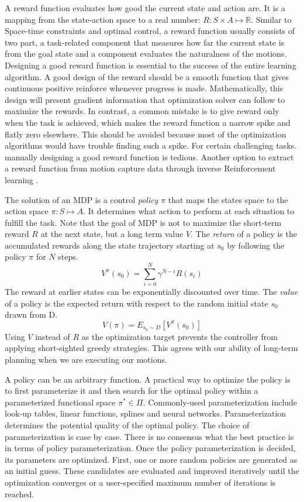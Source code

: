 A reward function evaluates how good the current state and action are. It is a mapping from the state-action space to a real number: $R: S\times A\mapsto \mathbb{R}$. Similar to Space-time constraints and optimal control, a reward function usually consists of two part, a task-related component that measures how far the current state is from the goal state and a component evaluates the naturalness of the motions. Designing a good reward function is essential to the success of the entire learning algorithm. A good design of the reward should be a smooth function that gives continuous positive reinforce whenever progress is made. Mathematically, this design will present gradient information that optimization solver can follow to maximize the rewards. In contrast, a common mistake is to give reward only when the task is achieved, which makes the reward function a narrow spike and flatly zero elsewhere. This should be avoided because most of the optimization algorithms would have trouble finding such a spike. For certain challenging tasks. manually designing a good reward function is tedious. Another option to extract a reward function from motion capture data through inverse Reinforcement learning \cite{}.

The solution of an MDP is a control \emph{policy} $\pi$ that maps the states space to the action space $\pi: S\mapsto A$. It determines what action to perform at each situation to fulfill the task. Note that the goal of MDP is not to maximize the short-term reward $R$ at the next state, but a long term value $V$. The \emph{return} of a policy is the accumulated rewards along the state trajectory starting at $s_0$ by following the policy $\pi$ for $N$ steps.
\begin{displaymath}
V^\pi(s_0)=\sum_{i=0}^N{\gamma^{N-i}R(s_i)}
\end{displaymath}
The reward at earlier states can be exponentially discounted over time. The \emph{value} of a policy is the expected return with respect to the random initial state $s_0$ drawn from D.
\begin{equation}
V(\pi)=E_{s_0\sim D}[V^\pi(s_0)]
\label{eq:policyValue}
\end{equation}
Using $V$ instead of $R$ as the optimization target prevents the controller from applying short-sighted greedy strategies. This agrees with our ability of long-term planning when we are executing our motions.

A policy can be an arbitrary function. A practical way to optimize the policy is to first parameterize it and then search for the optimal policy within a parameterized functional space $\pi^*\in\Pi$. Commonly-used parameterization include look-up tables, linear functions, splines and neural networks. Parameterization determines the potential quality of the optimal policy. The choice of parameterization is case by case. There is no consensus what the best practice is in terms of policy parameterization. Once the policy parameterization is decided, its parameters are optimized. First, one or more random policies are generated as an initial guess. These candidates are evaluated and improved iteratively until the optimization converges or a user-specified maximum number of iterations is reached.

